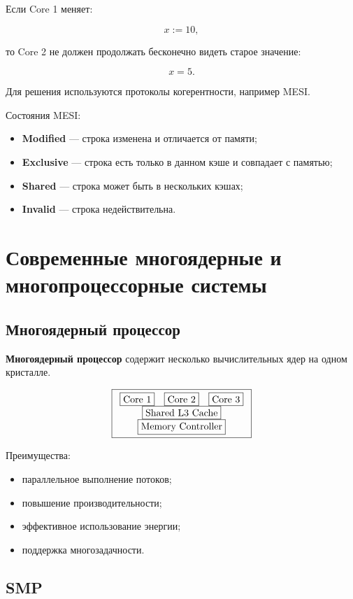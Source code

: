 \documentclass[12pt,a4paper]{article}
\theoremstyle{remark}
\begin{document}
Если Core 1 меняет:

\[
x := 10,
\]

то Core 2 не должен продолжать бесконечно видеть старое значение:

\[
x = 5.
\]

Для решения используются протоколы когерентности, например MESI.

Состояния MESI:
\begin{itemize}
    \item \textbf{Modified} --- строка изменена и отличается от памяти;
    \item \textbf{Exclusive} --- строка есть только в данном кэше и совпадает с памятью;
    \item \textbf{Shared} --- строка может быть в нескольких кэшах;
    \item \textbf{Invalid} --- строка недействительна.
\end{itemize}

\section{Современные многоядерные и многопроцессорные системы}

\subsection{Многоядерный процессор}

\textbf{Многоядерный процессор} содержит несколько вычислительных ядер на одном кристалле.

\[
\boxed{
\begin{array}{ccc}
\boxed{\text{Core 1}} & \boxed{\text{Core 2}} & \boxed{\text{Core 3}} \\
\multicolumn{3}{c}{\boxed{\text{Shared L3 Cache}}} \\
\multicolumn{3}{c}{\boxed{\text{Memory Controller}}}
\end{array}}
\]

Преимущества:
\begin{itemize}
    \item параллельное выполнение потоков;
    \item повышение производительности;
    \item эффективное использование энергии;
    \item поддержка многозадачности.
\end{itemize}

\subsection{SMP}
\end{document}
